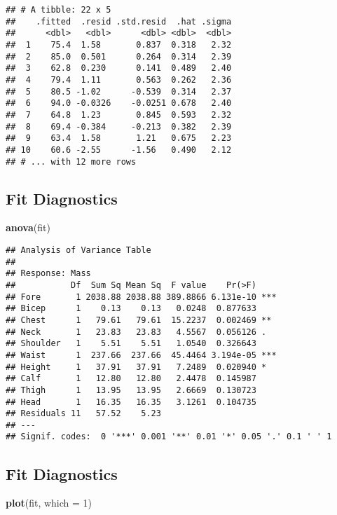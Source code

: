 \documentclass[]{article}
\newenvironment{Shaded}{\begin{snugshade}}{\end{snugshade}}
\newcommand{\KeywordTok}[1]{\textcolor[rgb]{0.13,0.29,0.53}{\textbf{#1}}}
\newcommand{\DataTypeTok}[1]{\textcolor[rgb]{0.13,0.29,0.53}{#1}}
\newcommand{\DecValTok}[1]{\textcolor[rgb]{0.00,0.00,0.81}{#1}}
\newcommand{\NormalTok}[1]{#1}
\begin{document}
\begin{verbatim}
## # A tibble: 22 x 5
##    .fitted  .resid .std.resid  .hat .sigma
##      <dbl>   <dbl>      <dbl> <dbl>  <dbl>
##  1    75.4  1.58       0.837  0.318   2.32
##  2    85.0  0.501      0.264  0.314   2.39
##  3    62.8  0.230      0.141  0.489   2.40
##  4    79.4  1.11       0.563  0.262   2.36
##  5    80.5 -1.02      -0.539  0.314   2.37
##  6    94.0 -0.0326    -0.0251 0.678   2.40
##  7    64.8  1.23       0.845  0.593   2.32
##  8    69.4 -0.384     -0.213  0.382   2.39
##  9    63.4  1.58       1.21   0.675   2.23
## 10    60.6 -2.55      -1.56   0.490   2.12
## # ... with 12 more rows
\end{verbatim}

\subsection{Fit Diagnostics}\label{fit-diagnostics-3}

\begin{Shaded}
\begin{Highlighting}[]
\KeywordTok{anova}\NormalTok{(fit) }
\end{Highlighting}
\end{Shaded}

\begin{verbatim}
## Analysis of Variance Table
## 
## Response: Mass
##           Df  Sum Sq Mean Sq  F value    Pr(>F)    
## Fore       1 2038.88 2038.88 389.8866 6.131e-10 ***
## Bicep      1    0.13    0.13   0.0248  0.877633    
## Chest      1   79.61   79.61  15.2237  0.002469 ** 
## Neck       1   23.83   23.83   4.5567  0.056126 .  
## Shoulder   1    5.51    5.51   1.0540  0.326643    
## Waist      1  237.66  237.66  45.4464 3.194e-05 ***
## Height     1   37.91   37.91   7.2489  0.020940 *  
## Calf       1   12.80   12.80   2.4478  0.145987    
## Thigh      1   13.95   13.95   2.6669  0.130723    
## Head       1   16.35   16.35   3.1261  0.104735    
## Residuals 11   57.52    5.23                       
## ---
## Signif. codes:  0 '***' 0.001 '**' 0.01 '*' 0.05 '.' 0.1 ' ' 1
\end{verbatim}

\subsection{Fit Diagnostics}\label{fit-diagnostics-4}

\begin{Shaded}
\begin{Highlighting}[]
\KeywordTok{plot}\NormalTok{(fit, }\DataTypeTok{which =} \DecValTok{1}\NormalTok{)}
\end{Highlighting}
\end{Shaded}
\end{document}
